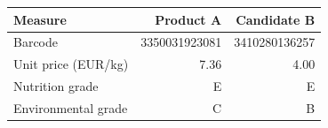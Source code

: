 \begin{tabular}{lrr}
\toprule
Measure & Product A & Candidate B \\
\midrule
Barcode & 3350031923081 & 3410280136257 \\
Unit price (EUR/kg) & 7.36 & 4.00 \\
Nutrition grade & E & E \\
Environmental grade & C & B \\
\bottomrule
\end{tabular}
